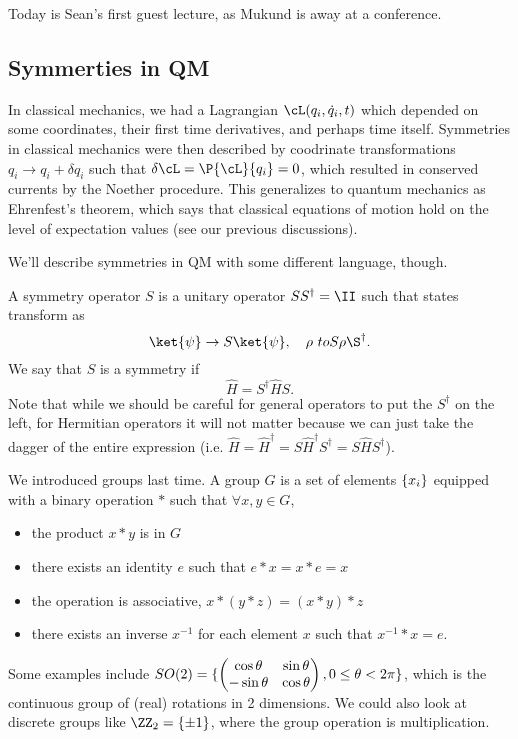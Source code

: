 \begin{note}
    Today is Sean's first guest lecture, as Mukund is away at a conference.
\end{note}
\subsection*{Symmerties in QM}
In classical mechanics, we had a Lagrangian $\cL(q_i, \dot q_i, t)$ which depended on some coordinates, their first time derivatives, and perhaps time itself. Symmetries in classical mechanics were then described by coodrinate transformations $q_i \to q_i  +\delta q_i$ such that $\delta \cL = \P{\cL}{q_i} =0$, which resulted in conserved currents by the Noether procedure. This generalizes to quantum mechanics as Ehrenfest's theorem, which says that classical equations of motion hold on the level of expectation values (see our previous discussions).

We'll describe symmetries in QM with some different language, though.
\begin{defn}
    A symmetry operator $S$ is a unitary operator $SS^\dagger = \II$ such that states transform as
    \begin{equation}
        \ket{\psi} \to S \ket{\psi}, \quad \rho \ to S \rho \S^\dagger.
    \end{equation}
    We say that $S$ is a symmetry if
    \begin{equation}
        \hat H = S^\dagger \hat H S.
    \end{equation}
    Note that while we should be careful for general operators to put the $S^\dagger$ on the left, for Hermitian operators it will not matter because we can just take the dagger of the entire expression (i.e. $\hat H = \hat H^\dagger = S \hat H^\dagger S^\dagger = S \hat H S^\dagger$).
\end{defn}

We introduced groups last time. A group $G$ is a set of elements $\{x_i\}$ equipped with a binary operation $*$ such that $\forall x,y \in G$,
\begin{itemize}
    \item the product $x*y$ is in $G$
    \item there exists an identity $e$ such that $e*x =x*e = x$
    \item the operation is associative, $x*(y*z)=(x*y)*z$
    \item there exists an inverse $x^{-1}$ for each element $x$ such that $x^{-1} * x = e$.
\end{itemize}
Some examples include $SO(2)=\{\begin{pmatrix}\cos \theta & \sin \theta \\
-\sin\theta & \cos\theta\end{pmatrix}, 0 \leq \theta < 2\pi\}$, which is the continuous group of (real) rotations in 2 dimensions. We could also look at discrete groups like $\ZZ_2=\set{\pm 1}$, where the group operation is multiplication.

